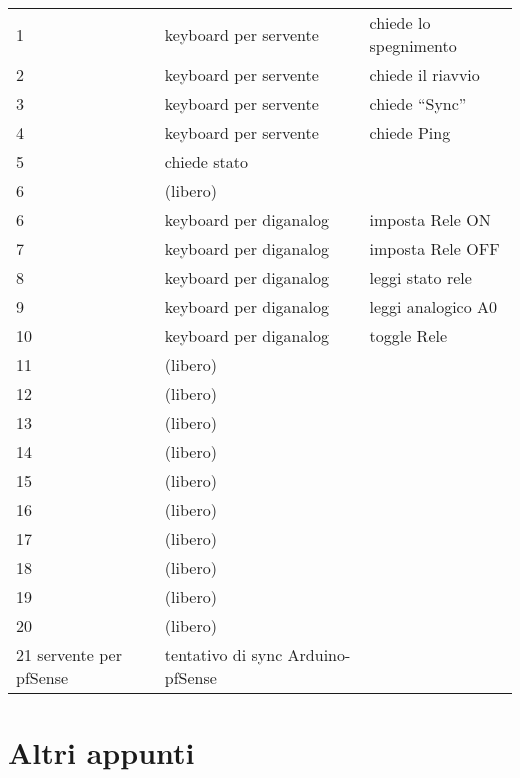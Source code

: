 \documentclass{article}
\begin{document}
    \begin{tabular}{lll}
        1 & keyboard per servente & chiede lo spegnimento \\
        2 & keyboard per servente & chiede il riavvio \\
        3 & keyboard per servente & chiede “Sync” \\
        4 & keyboard per servente & chiede Ping \\
        5 & chiede stato \\
        6 & (libero) \\
        6 & keyboard per diganalog & imposta Rele ON \\
        7 & keyboard per diganalog & imposta Rele OFF \\
        8 & keyboard per diganalog & leggi stato rele \\
        9 & keyboard per diganalog & leggi analogico A0 \\
        10 & keyboard per diganalog & toggle Rele 	  \\
        11 & (libero) & \\
        12 & (libero) & \\
        13 & (libero)  & \\
        14 & (libero)  & \\
        15 & (libero)  & \\
        16 & (libero)  & \\
        17 & (libero)  & \\
        18 & (libero)  & \\
        19 & (libero)  & \\
        20 & (libero)  & \\        
        21 servente per pfSense  & tentativo di sync Arduino-pfSense\\
        
    \end{tabular}


    
    \section{Altri appunti}
    
\end{document}
